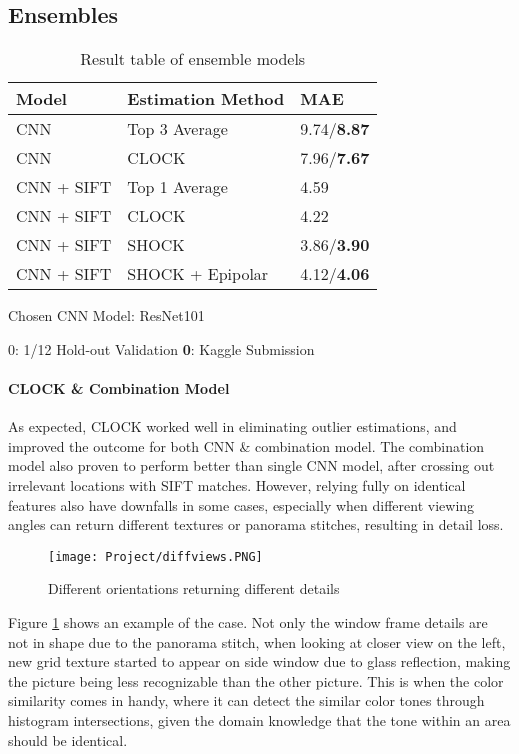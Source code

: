 \documentclass[11pt]{article}
\begin{document}
\begin{multicols}{2}
\subsection{Ensembles}

\begin{table}[H]
\centering
\caption{Result table of ensemble models}
\vspace{-0.4cm}
\begin{tabular}{|l|l|l|}
\hline
\textbf{Model} & \textbf{Estimation Method} & \textbf{MAE} \\ \hline
CNN & Top 3 Average & 9.74/\textbf{8.87} \\ \hline
CNN & CLOCK & 7.96/\textbf{7.67} \\ \hline
CNN + SIFT & Top 1 Average & 4.59 \\ \hline
CNN + SIFT & CLOCK & 4.22 \\ \hline
CNN + SIFT & SHOCK & 3.86/\textbf{3.90} \\ \hline
CNN + SIFT & SHOCK + Epipolar & 4.12/\textbf{4.06} \\ \hline
\end{tabular}
\parbox{0.45\textwidth}{\centering\small Chosen CNN Model: ResNet101}
\parbox{0.45\textwidth}{\centering\small 0: 1/12 Hold-out Validation \;\; \textbf{0}: Kaggle Submission}
\end{table}

\paragraph{CLOCK \& Combination Model} As expected, CLOCK worked well in eliminating outlier estimations, and improved the outcome for both CNN \& combination model. The combination model also proven to perform better than single CNN model, after crossing out irrelevant locations with SIFT matches. However, relying fully on identical features also have downfalls in some cases, especially when different viewing angles can return different textures or panorama stitches, resulting in detail loss.

\begin{figure}[H]
    \centering
    \texttt{[image: Project/diffviews.PNG]}
    \caption{Different orientations returning different details}
    \label{fig:diff}
\end{figure}

\noindent Figure \ref{fig:diff} shows an example of the case. Not only the window frame details are not in shape due to the panorama stitch, when looking at closer view on the left, new grid texture started to appear on side window due to glass reflection, making the picture being less recognizable than the other picture. This is when the color similarity comes in handy, where it can detect the similar color tones through histogram intersections, given the domain knowledge that the tone within an area should be identical.


\end{multicols}
\end{document}
